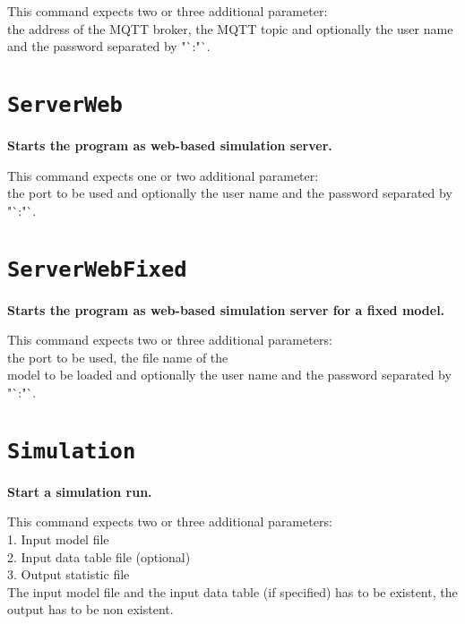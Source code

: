 This command expects two or three additional parameter:\\
the address of the MQTT broker, the MQTT topic and optionally the user name and the password separated by "`:"`.

\section{\texttt{ServerWeb}}

\textbf{Starts the program as web-based simulation server.}

This command expects one or two additional parameter:\\
the port to be used and optionally the user name and the password separated by "`:"`.

\section{\texttt{ServerWebFixed}}

\textbf{Starts the program as web-based simulation server for a fixed model.}

This command expects two or three additional parameters:\\
the port to be used, the file name of the\\
model to be loaded and optionally the user name and the password separated by "`:"`.

\section{\texttt{Simulation}}

\textbf{Start a simulation run.}

This command expects two or three additional parameters:\\
1. Input model file\\
2. Input data table file (optional)\\
3. Output statistic file\\
The input model file and the input data table (if specified) has to be existent, the output has to be non existent.

